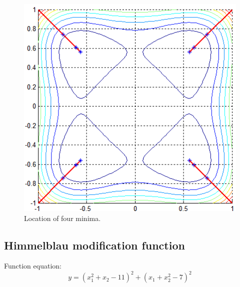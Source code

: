 \documentclass[12pt]{article}
\begin{document}
	\begin{figure}[H]
		\begin{center}
			\includegraphics[width=12cm]{four_results.png}
			\caption{Location of four minima.}
		\end{center}
	\end{figure}


\subsection{Himmelblau modification function}
Function equation:
\begin{equation}
	y=(x_1^2+x_2-11)^2 +(x_1+x_2^2-7)^2
\end{equation}
\end{document}
